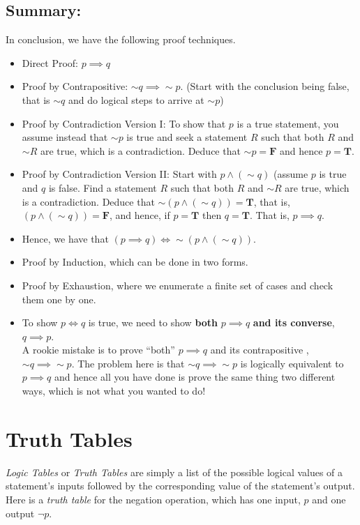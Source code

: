 \subsection{Summary:} In conclusion, we have the  following proof techniques.
    \begin{itemize}
        \item Direct Proof: $p \implies q$
        \item Proof by Contrapositive: $\sim q \implies \sim p$.   (Start with the conclusion being false, that is $\sim q$ and do logical steps to arrive at $\sim p$)
         \item Proof by Contradiction Version I: To show that $p$ is a true statement, you assume instead that $\sim p$ is true and seek a statement $R$ such that both $R$ and $\sim R$ are true, which is a contradiction. Deduce that $\sim p = \textbf{F}$ and hence $p= \textbf{T}$.
        \item Proof by Contradiction Version II: Start with $p \land (\sim q)$ (assume $p$ is true and $q$ is false. Find a statement $R$ such that both $R$ and $\sim R$ are true, which is a contradiction. Deduce that $\sim(p \land (\sim q)) = \textbf{T}$, that is, $(p \land (\sim q)) = \textbf{F}$, and hence, if $p=\textbf{T}$ then $q=\textbf{T}$. That is, $p \implies q$. 
        \item Hence, we have that $(p \implies q) \iff \sim(p \land (\sim q))$.
        \item Proof by Induction, which can be done in two forms.
        \item Proof by Exhaustion, where we enumerate a finite set of cases and check them one by one.
        \item To show $p \iff q$ is true, we need to show \textbf{both} $p \implies q$ \textbf{and its converse}, $q \implies p$. \\
        
        A rookie mistake is to prove ``both''  $p \implies q$ and its contrapositive , $\sim q \implies \sim p$. The problem here is that $\sim q \implies \sim p$ is logically equivalent to $p \implies q$ and hence all you have done is prove the same thing two different ways, which is not what you wanted to do! 
    \end{itemize}

\section{Truth Tables}

\emph{Logic Tables} or \emph{Truth Tables} are simply a list of the possible logical values of a statement's inputs followed by the corresponding value of the statement's output. Here is a \emph{truth table} for the negation operation, which has one input, $p$ and one output $\lnot p$.

